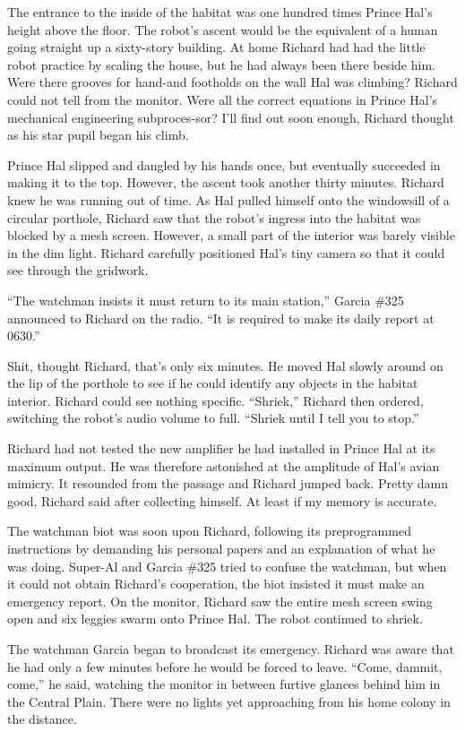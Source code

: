 \documentclass[]{article}
\begin{document}
{The entrance to the inside of the habitat was one hundred times Prince Hal’s height above the floor.  The robot’s ascent would be the equivalent of a human going straight up a sixty-story building.  At home Richard had had the little robot practice by scaling the house, but he had always been there beside him.  Were there grooves for hand-and footholds on the wall Hal was climbing? Richard could not tell from the monitor.  Were all the correct equations in Prince Hal’s mechanical engineering subproces-sor? I’ll find out soon enough, Richard thought as his star pupil began his climb.

Prince Hal slipped and dangled by his hands once, but eventually succeeded in making it to the top.  However, the ascent took another thirty minutes.  Richard knew he was running out of time.  As Hal pulled himself onto the windowsill of a circular porthole, Richard saw that the robot’s ingress into the habitat was blocked by a mesh screen.  However, a small part of the interior was barely visible in the dim light.  Richard carefully positioned Hal’s tiny camera so that it could see through the gridwork.

“The watchman insists it must return to its main station,” Garcia \#325 announced to Richard on the radio.  “It is required to make its daily report at 0630.”

Shit, thought Richard, that’s only six minutes.  He moved Hal slowly around on the lip of the porthole to see if he could identify any objects in the habitat interior.  Richard could see nothing specific.  “Shriek,” Richard then ordered, switching the robot’s audio volume to full.  “Shriek until I tell you to stop.”

Richard had not tested the new amplifier he had installed in Prince Hal at its maximum output.  He was therefore astonished at the amplitude of Hal’s avian mimicry.  It resounded from the passage and Richard jumped back.  Pretty damn good, Richard said after collecting himself.  At least if my memory is accurate.

The watchman biot was soon upon Richard, following its preprogrammed instructions by demanding his personal papers and an explanation of what he was doing.  Super-Al and Garcia \#325 tried to confuse the watchman, but when it could not obtain Richard’s cooperation, the biot insisted it must make an emergency report.  On the monitor, Richard saw the entire mesh screen swing open and six leggies swarm onto Prince Hal.  The robot continued to shriek.

The watchman Garcia began to broadcast its emergency.  Richard was aware that he had only a few minutes before he would be forced to leave.  “Come, dammit, come,” he said, watching the monitor in between furtive glances behind him in the Central Plain.  There were no lights yet approaching from his home colony in the distance.

}
\end{document}
